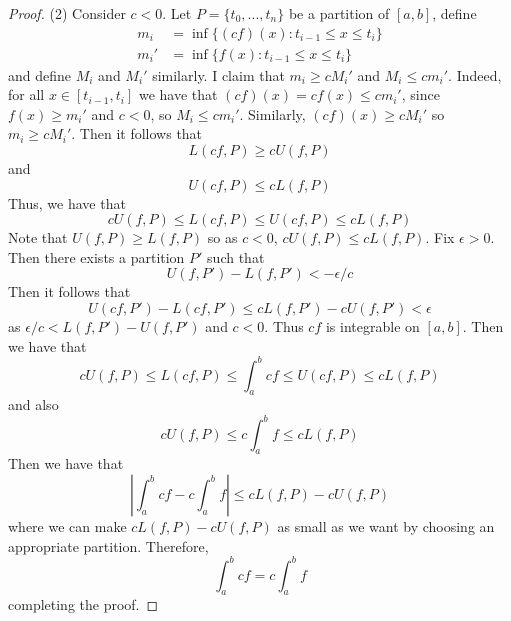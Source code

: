 \documentclass[12pt, a4paper, oneside, openright, titlepage]{book}
\begin{document}
\begin{proof}
    (2) Consider $c < 0$. Let $P = \{t_0,...,t_n\}$ be a partition of $[a,b]$, define \begin{align*}
        m_i &= \inf\{(cf)(x):t_{i-1} \leq x \leq t_i\} \\
        m_i' &= \inf\{f(x):t_{i-1} \leq x \leq t_i\} 
    \end{align*}
    and define $M_i$ and $M_i'$ similarly. I claim that $m_i \geq cM_i'$ and $M_i \leq cm_i'$. Indeed, for all $x \in [t_{i-1},t_i]$ we have that $(cf)(x) = cf(x) \leq cm_i'$, since $f(x) \geq m_i'$ and $c < 0$, so $M_i \leq cm_i'$. Similarly, $(cf)(x) \geq cM_i'$ so $m_i \geq cM_i'$. Then it follows that $$L(cf,P) \geq cU(f,P)$$ and $$U(cf,P) \leq cL(f,P)$$
    Thus, we have that $$cU(f,P) \leq L(cf,P) \leq U(cf,P) \leq cL(f,P)$$
    Note that $U(f,P) \geq L(f,P)$ so as $c < 0$, $cU(f,P) \leq cL(f,P)$. Fix $\epsilon > 0$. Then there exists a partition $P'$ such that $$U(f,P') - L(f,P') < -\epsilon/c$$
    Then it follows that \begin{equation*}
        U(cf,P') - L(cf,P') \leq cL(f,P') - cU(f,P') < \epsilon
    \end{equation*}
    as $\epsilon/c < L(f,P') - U(f,P')$ and $c < 0$. Thus $cf$ is integrable on $[a,b]$. Then we have that \begin{equation*}
        cU(f,P) \leq L(cf,P) \leq \int_a^bcf \leq U(cf,P) \leq cL(f,P)
    \end{equation*}
    and also \begin{equation*}
        cU(f,P) \leq c\int_a^bf\leq cL(f,P)
    \end{equation*}
    Then we have that \begin{equation*}
        \left|\int_a^bcf - c\int_a^bf\right| \leq cL(f,P) - cU(f,P) 
    \end{equation*}
    where we can make $cL(f,P) - cU(f,P)$ as small as we want by choosing an appropriate partition. Therefore, \begin{equation*}
        \int_a^bcf = c\int_a^bf
    \end{equation*}
    completing the proof.
\end{proof}
\end{document}
